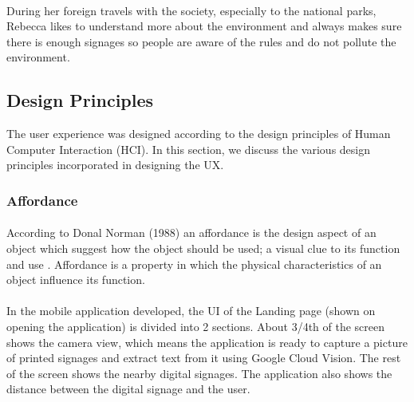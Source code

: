 \documentclass[12pt]{article}
\begin{document}
\paragraph{} During her foreign travels with the society, especially to the national parks, Rebecca likes to understand more about the environment and always makes sure there is enough signages so people are aware of the rules and do not pollute the environment. 


    \subsection{Design Principles}
    
    The user experience was designed according to the design principles of Human Computer Interaction (HCI). In this section, we discuss the various design principles incorporated in designing the UX. 
    
    \subsubsection{Affordance}
    \paragraph{}According to Donal Norman (1988) an affordance is the design aspect of an object which suggest how the object should be used; a visual clue to its function and use \cite{norman}. Affordance is a property in which the physical characteristics of an object influence its function. 
    
    \paragraph{} In the mobile application developed, the UI of the Landing page (shown on opening the application) is divided into 2 sections. About 3/4th of the screen shows the camera view, which means the application is ready to capture a picture of printed signages and extract text from it using Google Cloud Vision. The rest of the screen shows the nearby digital signages. The application also shows the distance between the digital signage and the user.
    
\end{document}
